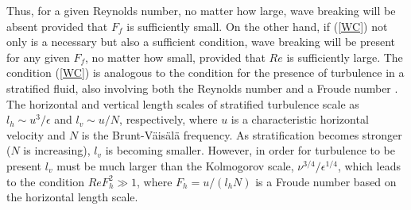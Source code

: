 Thus,  for a given Reynolds number, no matter how large, wave breaking will be absent provided that $ F_f $ is sufficiently small. On the other hand, if (\ref{WC}) not only is a necessary but also a sufficient condition,  wave breaking will be present for any given $ F_f $, no matter how small, provided that $ Re $ is sufficiently large. The condition (\ref{WC}) is analogous to the condition for the presence of turbulence in a stratified fluid, also involving both the Reynolds number and a Froude number \cite[]{Brethouwer2007}. The horizontal and vertical length scales of stratified turbulence scale as $ l_h \sim u^{3}/\epsilon $ and $ l_v \sim u/N $, respectively, where $ u $ is a characteristic horizontal velocity and $ N $ is the Brunt-V\"ais\"al\"a frequency. As stratification becomes stronger ($ N $ is increasing), $ l_v $ is becoming smaller.  However, in order for turbulence to be present $ l_v $ must be much larger than the Kolmogorov scale, $ \nu^{3/4}/\epsilon^{1/4} $, which leads to the condition $ Re F_h^2 \gg 1 $, where $ F_h = u/(l_h N) $ is a Froude number based on the horizontal length scale. 
 
